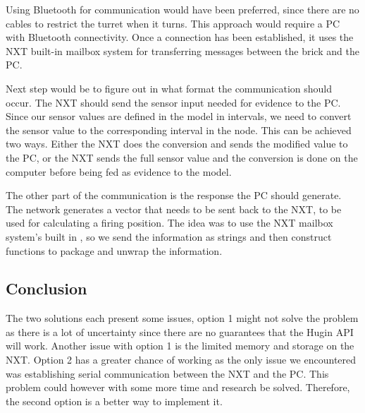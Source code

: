 Using Bluetooth for communication would have been preferred, since there are
no cables to restrict the turret when it turns.
This approach would require a PC with Bluetooth connectivity. Once a connection
has been established, it uses the NXT built-in mailbox system for transferring
messages between the brick and the PC.\nl

Next step would be to figure out in what format the communication should occur.
The NXT should send the sensor input needed for evidence to the PC. Since our
sensor values are defined in the model in intervals, we need to convert the
sensor value to the corresponding interval in the node. This can be achieved two ways. Either the NXT does the conversion and sends the modified value to the PC, or the NXT
sends the full sensor value and the conversion is done on the computer before
being fed as evidence to the model.\nl

The other part of the communication is the response the PC should generate. The
network generates a vector that needs to be sent back to the NXT, to be used for
calculating a firing position. The idea was to use the NXT mailbox system's
built in , so we send the information as strings and then
construct functions to package and unwrap the information.

\subsection{Conclusion}
The two solutions each present some issues, option 1 might not solve the problem
as there is a lot of uncertainty since there are no guarantees that the Hugin
API will work. Another issue with option 1 is the limited memory and storage on
the NXT. Option 2 has a greater chance of working as the only issue we
encountered was establishing serial communication between the NXT and the PC.
This problem could however with some more time and research be solved.
Therefore, the second option is a better way to implement it.



